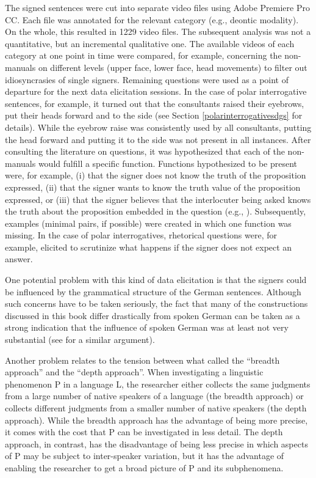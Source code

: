 The signed sentences were cut into separate video files using Adobe Premiere Pro CC. Each file was annotated for the relevant category (e.g., deontic modality). On the whole, this resulted in 1229 video files. The subsequent analysis was not a quantitative, but an incremental qualitative one. The available videos of each category at one point in time were compared, for example, concerning the non-manuals on different levels (upper face, lower face, head movements) to filter out idiosyncrasies of single signers. Remaining questions were used as a point of departure for the next data elicitation sessions. In the case of polar interrogative sentences, for example, it turned out that the consultants raised their eyebrows, put their heads forward and to the side (see Section \ref{polarinterrogativesdgs} for details). While the eyebrow raise was consistently used by all consultants, putting the head forward and putting it to the side was not present in all instances. After consulting the literature on questions, it was hypothesized that each of the non-manuals would fulfill a specific function. Functions hypothesized to be present were, for example, (i) that the signer does not know the truth of the proposition expressed, (ii) that the signer wants to know the truth value of the proposition expressed, or (iii) that the signer believes that the interlocuter being asked knows the truth about the proposition embedded in the question (e.g., \citealt[4]{dayal2016questions}). Subsequently, examples (minimal pairs, if possible) were created in which one function was missing. In the case of polar interrogatives, rhetorical questions were, for example, elicited to scrutinize what happens if the signer does not expect an answer.

One potential problem with this kind of data elicitation is that the signers could be influenced by the grammatical structure of the German sentences. Although such concerns have to be taken seriously, the fact that many of the constructions discussed in this book differ drastically from spoken German can be taken as a strong indication that the influence of spoken German was at least not very substantial (see \citealt[281]{cecchetto2009another} for a similar argument).

Another problem relates to the tension between what \citet[26]{zyman2012two} called the ``breadth approach'' and the ``depth approach''. When investigating a linguistic phenomenon P in a language L, the researcher either collects the same judgments from a large number of native speakers of a language (the breadth approach) or collects different judgments from a smaller number of native speakers (the depth approach). While the breadth approach has the advantage of being more precise, it comes with the cost that P can be investigated in less detail. The depth approach, in contrast, has the disadvantage of being less precise in which aspects of P may be subject to inter-speaker variation, but it has the advantage of enabling the researcher to get a broad picture of P and its subphenomena.

